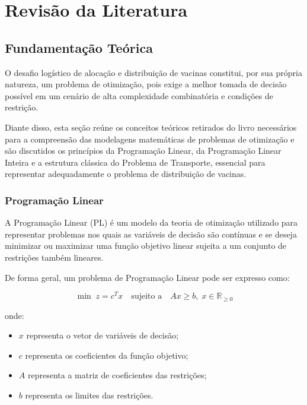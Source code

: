\chapter{Revisão da Literatura}


\section{Fundamentação Teórica}

O desafio logístico de alocação e distribuição de vacinas constitui, por sua própria natureza, um problema de otimização, pois exige a melhor tomada de decisão possível em um cenário de alta complexidade combinatória e condições de restrição.

Diante disso, esta seção reúne os conceitos teóricos retirados do livro \cite{DantzigThapa:1997} necessários para a compreensão das modelagens matemáticas de problemas de otimização e são discutidos os princípios da Programação Linear, da Programação Linear Inteira e a estrutura clássica do Problema de Transporte, essencial para representar adequadamente o problema de distribuição de vacinas.

\subsection{Programação Linear}

A Programação Linear (PL) é um modelo da teoria de otimização utilizado para representar problemas nos quais as variáveis de decisão são contínuas e se deseja minimizar ou maximizar uma função objetivo linear sujeita a um conjunto de restrições também lineares.

De forma geral, um problema de Programação Linear pode ser expresso como:

\[
\min \; z = c^T x \quad \text{sujeito a} \quad Ax \ge b, \; x \in \mathbb{R}_{\geq 0}
\]

onde:
\begin{itemize}
    \item $x$ representa o vetor de variáveis de decisão;
    \item $c$ representa os coeficientes da função objetivo;
    \item $A$ representa a matriz de coeficientes das restrições;
    \item $b$ representa os limites das restrições.
\end{itemize}


